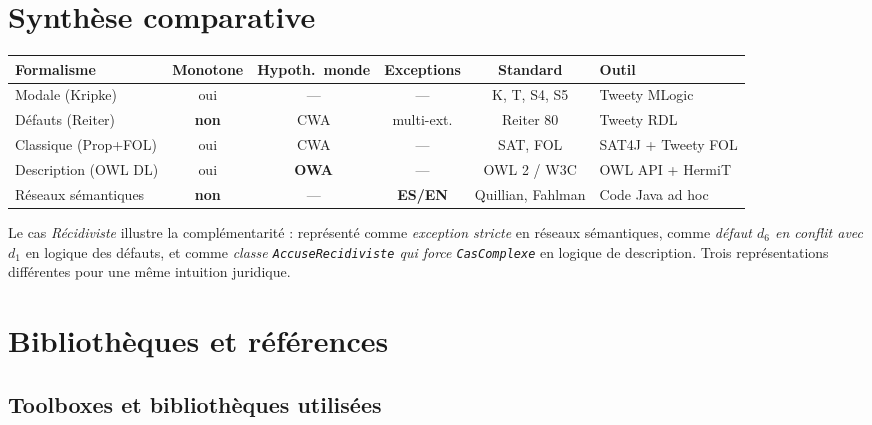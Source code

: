 \documentclass[11pt, a4paper]{article}
\newcommand{\code}[1]{\texttt{#1}}
\begin{document}
\newpage
\section{Synthèse comparative}

\begin{center}\small
\begin{tabularx}{\linewidth}{lccccX}
\toprule
\textbf{Formalisme} & \textbf{Monotone} & \textbf{Hypoth.\ monde} & \textbf{Exceptions} & \textbf{Standard} & \textbf{Outil} \\
\midrule
Modale (Kripke)        & oui          & ---  & ---           & K, T, S4, S5      & Tweety MLogic \\
Défauts (Reiter)       & \textbf{non} & CWA  & multi-ext.    & Reiter 80         & Tweety RDL \\
Classique (Prop+FOL)   & oui          & CWA  & ---           & SAT, FOL          & SAT4J + Tweety FOL \\
Description (OWL DL)   & oui          & \textbf{OWA} & ---   & OWL 2 / W3C       & OWL API + HermiT \\
Réseaux sémantiques    & \textbf{non} & ---  & \textbf{ES/EN} & Quillian, Fahlman & Code Java ad hoc \\
\bottomrule
\end{tabularx}
\end{center}

\noindent Le cas \emph{Récidiviste} illustre la complémentarité : représenté
comme \emph{exception stricte} en réseaux sémantiques, comme \emph{défaut $d_6$
en conflit avec $d_1$} en logique des défauts, et comme \emph{classe
\code{AccuseRecidiviste} qui force \code{CasComplexe}} en logique de
description. Trois représentations différentes pour une même intuition
juridique.

\newpage
\section{Bibliothèques et références}

\subsection*{Toolboxes et bibliothèques utilisées}
\end{document}
